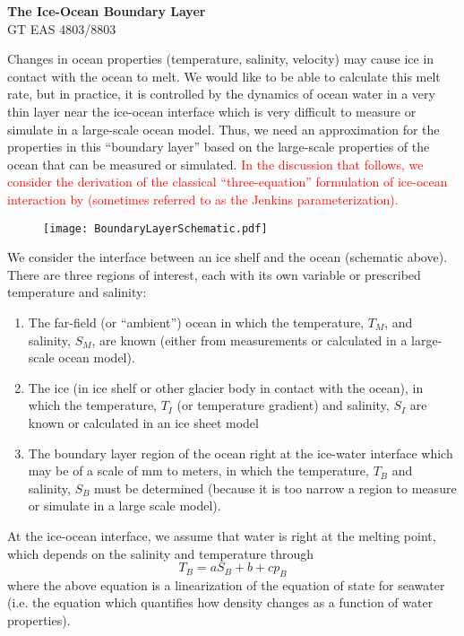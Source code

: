 \documentclass[12pt]{article}
\theoremstyle{definition}
\begin{document}
\thispagestyle{empty}

\begin{center}
{\LARGE \bf The Ice-Ocean Boundary Layer}\\
{\large GT EAS 4803/8803}\\
\end{center}

Changes in ocean properties (temperature, salinity, velocity) may cause ice in contact with the ocean to melt. We would like to be able to calculate this melt rate, but in practice, it is controlled by the dynamics of ocean water in a very thin layer near the ice-ocean interface which is very difficult to measure or simulate in a large-scale ocean model. Thus, we need an approximation for the properties in this ``boundary layer'' based on the large-scale properties of the ocean that can be measured or simulated. \textcolor{red}{In the discussion that follows, we consider the derivation of the classical ``three-equation'' formulation of ice-ocean interaction by \cite{hollandj1999:meltparam} (sometimes referred to as the Jenkins parameterization).} 

\begin{figure}[h]
  \begin{center}
\texttt{[image: BoundaryLayerSchematic.pdf]}
  \end{center}
\end{figure}

We consider the interface between an ice shelf and the ocean (schematic above). There are three regions of interest, each with its own variable or prescribed temperature and salinity:
\begin{enumerate}
\item The far-field (or ``ambient'') ocean in which the temperature, $T_M$, and salinity, $S_M$, are known (either from measurements or calculated in a large-scale ocean model).
\item The ice (in ice shelf or other glacier body in contact with the ocean), in which the temperature, $T_I$ (or temperature gradient) and salinity, $S_I$ are known or calculated in an ice sheet model
\item The boundary layer region of the ocean right at the ice-water interface which may be of a scale of mm to meters, in which the temperature, $T_B$ and salinity, $S_B$ must be determined (because it is too narrow a region to measure or simulate in a large scale model).
\end{enumerate}
At the ice-ocean interface, we assume that water is right at the melting point, which depends on the salinity and temperature through
\begin{equation}
T_B = aS_B + b + cp_B
\end{equation}
where the above equation is a linearization of the equation of state for seawater (i.e. the equation which quantifies how density changes as a function of water properties).
\end{document}
